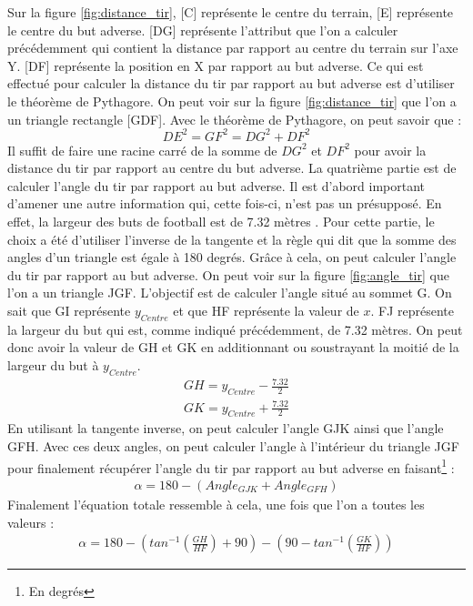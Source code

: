 \documentclass[12pt]{article}
\begin{document}
\noindent Sur la figure \ref{fig:distance_tir}, [C] représente le centre du terrain, [E] représente le centre du but adverse.
[DG] représente l'attribut que l'on a calculer précédemment qui contient la distance par rapport au centre du terrain sur l'axe Y.
[DF] représente la position en X par rapport au but adverse.
Ce qui est effectué pour calculer la distance du tir par rapport au but adverse est d'utiliser le théorème de Pythagore.
On peut voir sur la figure \ref{fig:distance_tir} que l'on a un triangle rectangle [GDF].
Avec le théorème de Pythagore, on peut savoir que :
\begin{equation}
    DE^2 = GF^2 = DG^2 + DF^2
\end{equation}
Il suffit de faire une racine carré de la somme de $DG^2$ et $DF^2$ pour avoir la distance du tir par rapport au centre du but adverse.
\newline\newline
La quatrième partie est de calculer l'angle du tir par rapport au but adverse.
Il est d'abord important d'amener une autre information qui, cette fois-ci, n'est pas un présupposé.
En effet, la largeur des buts de football est de 7.32 mètres \cite{TerrainIFAB}.
Pour cette partie, le choix a été d'utiliser l'inverse de la tangente et la règle qui dit que la somme des angles d'un triangle est égale à 180 degrés.
Grâce à cela, on peut calculer l'angle du tir par rapport au but adverse.
On peut voir sur la figure \ref{fig:angle_tir} que l'on a un triangle JGF.
L'objectif est de calculer l'angle situé au sommet G.
On sait que GI représente $y_{Centre}$ et que HF représente la valeur de $x$.
FJ représente la largeur du but qui est, comme indiqué précédemment, de 7.32 mètres.
On peut donc avoir la valeur de GH et GK en additionnant ou soustrayant la moitié de la largeur du but à $y_{Centre}$.
\begin{equation}
    \begin{split}
        GH = y_{Centre} - \frac{7.32}{2} \\
        GK = y_{Centre} + \frac{7.32}{2}
    \end{split}
\end{equation}
En utilisant la tangente inverse, on peut calculer l'angle GJK ainsi que l'angle GFH.
Avec ces deux angles, on peut calculer l'angle à l'intérieur du triangle JGF pour finalement récupérer l'angle du tir par rapport au but adverse en faisant\footnote{En degrés} :
\begin{equation}
    \begin{split}
        \alpha = 180 - (Angle_{GJK} + Angle_{GFH})
    \end{split}
\end{equation}
Finalement l'équation totale ressemble à cela, une fois que l'on a toutes les valeurs :
\begin{equation}
    \begin{split}
        \alpha = 180 - (tan^{-1}(\frac{GH}{HF}) + 90) - (90 -tan^{-1}(\frac{GK}{HF}))
    \end{split}
\end{equation}
\end{document}

